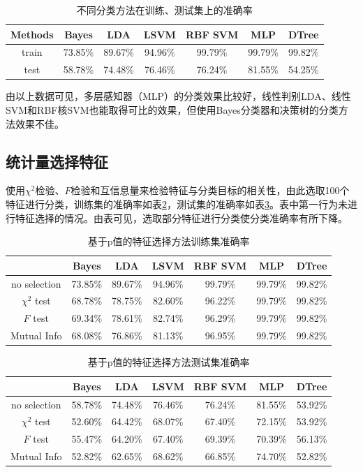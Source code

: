 \begin{table}[htbp]
\centering
\begin{tabular}{ccccccc}
\toprule
Methods &   Bayes &     LDA &    LSVM & RBF SVM &     MLP &   DTree \\
\midrule
train &  73.85\% &  89.67\% &  94.96\% &  99.79\% &  99.79\% &  99.82\% \\
test &  58.78\% &  74.48\% &  76.46\% &  76.24\% &  81.55\% &  54.25\% \\
\bottomrule
\end{tabular}
\caption{不同分类方法在训练、测试集上的准确率}
\label{tab:classify}
\end{table}

由以上数据可见，多层感知器（MLP）的分类效果比较好，线性判别LDA、线性SVM和RBF核SVM也能取得可比的效果，但使用Bayes分类器和决策树的分类方法效果不佳。

\subsection{统计量选择特征}
使用$\chi^2$检验、$F$检验和互信息量来检验特征与分类目标的相关性，由此选取100个特征进行分类，训练集的准确率如表\ref{tab:sel_train}，测试集的准确率如表\ref{tab:sel_test}。表中第一行为未进行特征选择的情况。由表可见，选取部分特征进行分类使分类准确率有所下降。

\begin{table}[htbp]
\centering
\begin{tabular}{ccccccc}
\toprule
{} &   Bayes &     LDA &    LSVM & RBF SVM &     MLP &   DTree \\
\midrule
no selection &  73.85\% &  89.67\% &  94.96\% &  99.79\% &  99.79\% &  99.82\% \\
$\chi^2$ test &  68.78\% &  78.75\% &  82.60\% &  96.22\% &  99.79\% &  99.82\% \\
$F$ test &  69.34\% &  78.61\% &  82.74\% &  96.29\% &  99.79\% &  99.82\% \\
Mutual Info &  68.08\% &  76.86\% &  81.13\% &  96.95\% &  99.79\% &  99.82\% \\
\bottomrule
\end{tabular}
\caption{基于p值的特征选择方法训练集准确率}
\label{tab:sel_train}
\end{table}

\begin{table}[htbp]
\centering
\begin{tabular}{ccccccc}
\toprule
{} &   Bayes &     LDA &    LSVM & RBF SVM &     MLP &   DTree \\
\midrule
no selection &  58.78\% &  74.48\% &  76.46\% &  76.24\% &  81.55\% &  53.92\% \\
$\chi^2$ test & 52.60\% &  64.42\% &  68.07\% &  67.40\% &  72.15\% &  53.92\% \\
$F$ test &      55.47\% &  64.20\% &  67.40\% &  69.39\% &  70.39\% &  56.13\% \\
Mutual Info &   52.82\% &  62.65\% &  68.62\% &  66.85\% &  74.70\% &  52.82\% \\
\bottomrule
\end{tabular}
\caption{基于p值的特征选择方法测试集准确率}
\label{tab:sel_test}
\end{table}


